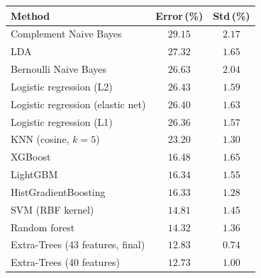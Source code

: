 \begin{tabular}{lcc}
\toprule
Method & Error\,(\%) & Std\,(\%) \\
\midrule
Complement Naive Bayes & $29.15$ & $2.17$ \\
LDA & $27.32$ & $1.65$ \\
Bernoulli Naive Bayes & $26.63$ & $2.04$ \\
\addlinespace[4pt]
Logistic regression (L2) & $26.43$ & $1.59$ \\
Logistic regression (elastic net) & $26.40$ & $1.63$ \\
Logistic regression (L1) & $26.36$ & $1.57$ \\
\addlinespace[4pt]
KNN (cosine, $k{=}5$) & $23.20$ & $1.30$ \\
\addlinespace[4pt]
XGBoost & $16.48$ & $1.65$ \\
LightGBM & $16.34$ & $1.55$ \\
HistGradientBoosting & $16.33$ & $1.28$ \\
\addlinespace[4pt]
SVM (RBF kernel) & $14.81$ & $1.45$ \\
\addlinespace[4pt]
Random forest & $14.32$ & $1.36$ \\
Extra-Trees (43 features, final) & $12.83$ & $0.74$ \\
Extra-Trees (40 features) & $12.73$ & $1.00$ \\
\bottomrule
\end{tabular}

